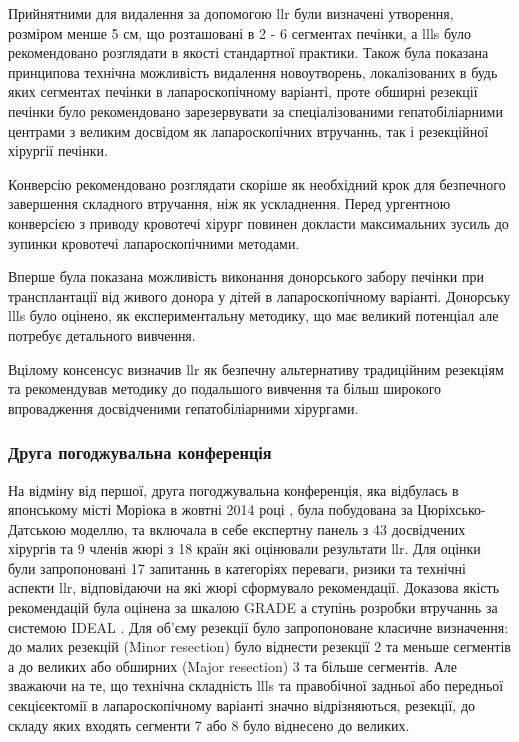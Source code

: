 \begin{refsection}
Прийнятними для видалення за допомогою  \acrshort{llr} були визначені утворення, розміром менше 5 см, що розташовані в 2 - 6 сегментах печінки, а \acrshort{llls} було рекомендовано розглядати в якості стандартної практики. Також була показана принципова технічна можливість видалення новоутворень, локалізованих в будь яких сегментах печінки в лапароскопічному варіанті, проте обширні резекції печінки було рекомендовано зарезервувати за спеціалізованими гепатобіліарними центрами з великим досвідом як лапароскопічних втручаннь, так і резекційної хірургії печінки. 

Конверсію рекомендовано розглядати скоріше як необхідний крок для безпечного завершення складного втручання, ніж як ускладнення. Перед ургентною конверсією з приводу кровотечі хірург повинен докласти максимальних зусиль до зупинки кровотечі лапароскопічними методами. 

Вперше була показана можливість виконання донорського забору печінки при трансплантації від живого донора у дітей в лапароскопічному варіанті. Донорську \acrshort{llls} було оцінено, як експериментальну методику, що має великий потенціал але потребує детального вивчення. 

Вцілому консенсус визначив \acrshort{llr} як безпечну альтернативу традиційним резекціям та рекомендував методику до подальшого вивчення та більш широкого впровадження досвідченими гепатобіліарними хірургами.

\subsubsection{Друга погоджувальна конференція} 

На відміну від першої, друга погоджувальна конференція, яка відбулась в японському місті Моріока в жовтні 2014 році \cite{Kaneko2015}, була побудована за Цюріхсько-Датською моделлю, та включала в себе експертну панель з 43 досвідчених хірургів та 9 членів жюрі з 18 країн які оцінювали результати \acrshort{llr}. Для оцінки були запропоновані 17 запитаннь в категоріях переваги, ризики та технічні аспекти \acrshort{llr}, відповідаючи на які жюрі сформувало рекомендації. Доказова якість рекомендацій була оцінена за шкалою GRADE а ступінь розробки втручаннь за системою IDEAL \cite{Guyatt2008, McCulloch2009}. Для об'єму резекції було запропоноване класичне визначення: до малих резекцій (Minor resection) було віднести резекції 2 та меньше сегментів а до великих або обширних (Major resection) 3 та більше сегментів. Але зважаючи на те, що технічна складність \acrshort{llls} та правобічної задньої або передньої секцієектомії в лапароскопічному варіанті значно відрізняються, резекції, до складу яких входять сегменти 7 або 8 було віднесено до великих. 


\end{refsection}
